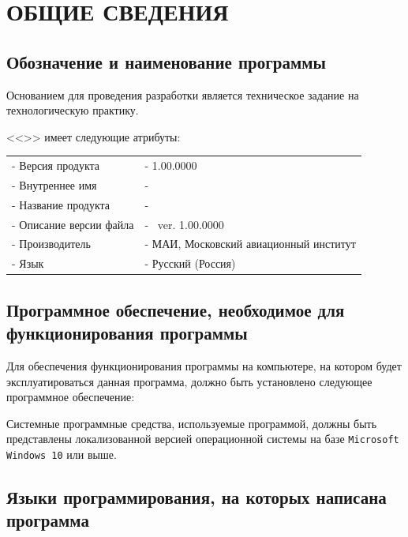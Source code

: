 \documentclass[14pt,a4paper,final]{extreport}
\begin{document}
\pagebreak


\begin{small}
\tableofcontents
\end{small}

\pagebreak

\chapter{ОБЩИЕ СВЕДЕНИЯ}
\section{Обозначение и наименование программы}

Основанием для проведения разработки является техническое задание на технологическую практику.

<<\doctitleoneline>> имеет следующие атрибуты:
\begin{table}[ht]
	\centering
	\begin{tabular}{p{7cm} p{11cm}}
		- Версия продукта &  - 1.00.0000\\ 
		- Внутреннее имя	 &  - \programtitle \\
		- Название продукта &  - \programtitle \\
		- Описание версии файла &  - \programtitle\ ver. 1.00.0000 \\
		- Производитель &  - МАИ, Московский авиационный институт \\ %
		- Язык &  - Русский (Россия) \\																	
	\end{tabular}
\end{table}

\section{Программное обеспечение, необходимое для функционирования программы}

Для обеспечения функционирования программы на компьютере, на котором будет эксплуатироваться данная программа, должно быть установлено следующее программное обеспечение:

Системные программные средства, используемые программой, должны быть представлены локализованной версией операционной системы на базе
\texttt{Microsoft Windows 10} или выше.

\section{Языки программирования, на которых написана программа}
\end{document}
